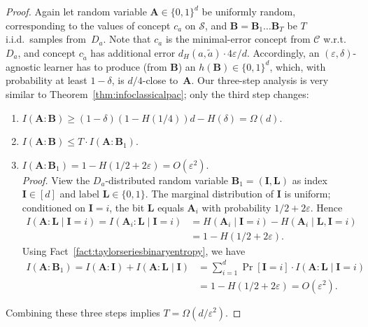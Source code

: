 \documentclass[twoside,11pt]{article}
\newcommand{\eps}{\varepsilon}
\newcommand{\Sh}{\ensuremath{\mathcal{S}}}
\def\01{\{0,1\}}
\newcommand{\C}{\ensuremath{\mathscr{C}}}
\begin{document}
\begin{proof}
	Again let random variable $\mathbf{A}\in\01^d$ be uniformly random, corresponding to the values of concept $c_a$ on $\Sh$, and $\mathbf{B}=\mathbf{B}_1\ldots\mathbf{B}_T$ be $T$ i.i.d.\ samples from~$D_a$. Note that $c_a$ is the minimal-error concept from $\C$ w.r.t.\ $D_a$, and concept $c_{\tilde{a}}$ has additional error $d_H(a,\tilde{a})\cdot 4\eps/d$.
	Accordingly, an $(\eps,\delta)$-agnostic learner has to produce (from $\mathbf{B}$) an $h(\mathbf{B})\in\01^d$, which, with probability at least $1-\delta$, is $d/4$-close to~$\mathbf{A}$.
	Our three-step analysis is very similar to Theorem~\ref{thm:infoclassicalpac};
	only the third step changes:
	\begin{enumerate}
		\item $I(\mathbf{A}:\mathbf{B})\geq (1-\delta)(1-H(1/4))d - H(\delta)=\Omega(d)$.
		\item $I(\mathbf{A}:\mathbf{B})\leq T\cdot I(\mathbf{A}:\mathbf{B}_1)$.
		\item $I(\mathbf{A}:\mathbf{B}_1)=1-H(1/2+2\eps)=O(\eps^2)$.\\[2mm]
		\emph{Proof.} View the $D_a$-distributed random variable $\mathbf{B}_1=(\mathbf{I},\mathbf{L})$ as index $\mathbf{I}\in[d]$ and label $\mathbf{L}\in\01$. The marginal distribution of $\mathbf{I}$ is uniform; conditioned on $\mathbf{I}=i$, the bit $\mathbf{L}$ equals $\mathbf{A}_i$ with probability $1/2+2\eps$. Hence 
		\begin{align*}
		I(\mathbf{A}:\mathbf{L}\mid \mathbf{I}=i)=I(\mathbf{A}_i:\mathbf{L}\mid \mathbf{I}=i)
		&=H(\mathbf{A}_i\mid \mathbf{I}=i)-H(\mathbf{A}_i\mid\mathbf{L},\mathbf{I}=i)\\
		&=1-H(1/2+2\eps).
		\end{align*} 
		Using Fact~\ref{fact:taylorseriesbinaryentropy}, we have
		\begin{align*}
		I(\mathbf{A}:\mathbf{B}_1)=I(\mathbf{A}:\mathbf{I})+I(\mathbf{A}:\mathbf{L}\mid \mathbf{I})&=\sum_{i=1}^d \Pr[\mathbf{I}=i]\cdot I(\mathbf{A}:\mathbf{L}\mid \mathbf{I}=i)\\
		&=1-H(1/2+2\eps)=O(\eps^2).
		\end{align*}
	\end{enumerate}
	Combining these three steps implies $T=\Omega(d/\eps^2)$.
\end{proof}
\end{document}
